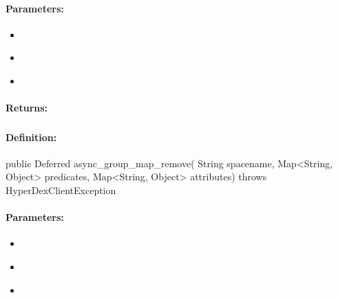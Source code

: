 \paragraph{Parameters:}
\begin{itemize}[noitemsep]
\item {}\\

\item {}\\

\item {}\\

\end{itemize}

\paragraph{Returns:}


\pagebreak
\subsubsection{}
\label{api:java:async_group_map_remove}


\paragraph{Definition:}
\begin{javacode}
public Deferred async_group_map_remove(
        String spacename,
        Map<String, Object> predicates,
        Map<String, Object> attributes) throws HyperDexClientException
\end{javacode}

\paragraph{Parameters:}
\begin{itemize}[noitemsep]
\item {}\\

\item {}\\

\item {}\\

\end{itemize}

